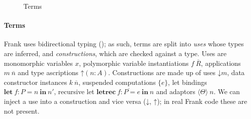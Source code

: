 \documentclass[msc,deptreport,cs]{infthesis} %
\makeatletter
\newcommand\figscale{0.85}
\newcommand{\many}{\overline}
\newcommand\ba{\begin{array}}
\newcommand\ea{\end{array}}
\newenvironment{syntax}{\[\ba{@{}l@{~}r@{~}c@{~}l@{}}}{\ea\]\ignorespacesafterend}
\newcommand{\adapt}{\Theta}
\newcommand{\key}[1]{\mathbf{#1}} %
\newcommand{\handleSymbol}{\rightarrow}
\newcommand{\handle}[2]{{#1} \handleSymbol {#2}}
\newcommand{\thunk}[1]{\{{#1}\}}
\newcommand\slab[1]{(\textrm{#1})}
\newcommand{\effin}[1]{\langle {#1} \rangle}
\newcommand{\uc}{\mathord{\downarrow}}
\newcommand{\cu}{\mathord{\uparrow}}
\newcommand{\gor}{\mid}
\makeatother
\begin{document}
\begin{figure} %
\centering
\scalebox{\figscale}{%
\begin{syntax}
  \slab{constructors}               & k \\
  \slab{commands}                   & c \\
  \slab{uses}                 & m      &::= &
     x \gor f~\many{R} \gor m~\many{n} \gor \cu(n:A) \\
  \slab{constructions}        & n      &::= &
    \uc m \gor k~\many{n} \gor c~\many{R}~\many{n} \gor \thunk{e} \\
                              &        &\gor& \key{let}~f : P = n~\key{in}~n'
                                   \gor
                                   \key{letrec}~\many{f : P = e}~\key{in}~n \\
                              &        &\gor&  \effin{\adapt}~n \\
  \slab{computations}         & e      &::=& \many{\many{r} \mapsto n}
  \\
  \slab{computation patterns} & r      &::=& p
                                        \gor \effin{\handle{c~\many{p}\,}{z}}
                                        \gor \effin{x} \\
  \slab{value patterns}       & p      &::=& k~\many{p} \gor x        \\
\end{syntax}
}
\caption{Terms}
\label{fig:terms}
\end{figure}

\paragraph*{Terms} Frank uses bidirectional typing (\cite{pierce2000local}); as such, terms are
split into \emph{uses} whose types are inferred, and \emph{constructions}, which
are checked against a type. Uses are monomorphic variables $x$, polymorphic
variable instantiations $f~\many{R}$, applications $m~\many{n}$ and type
ascriptions $\cu(n:A)$. Constructions are made up of uses $\uc m$, data
constructor instances $k~\many{n}$, suspended computations $\thunk{e}$, let
bindings $\key{let}~f : P = n~\key{in}~n'$, recursive let $\key{letrec}~\many{f
  : P = e}~\key{in}~n$ and adaptors $\effin{\adapt}~n$. We can inject a use into
a construction and vice versa ($\uc$, $\cu$); in real Frank code these are not
present.
\end{document}

